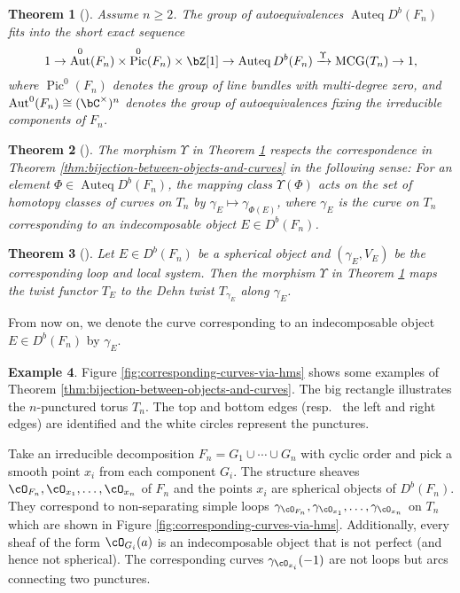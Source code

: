 \documentclass{amsart}
\numberwithin{equation}{section}
\theoremstyle{plain}
\newtheorem{theorem}{Theorem}[section]
\theoremstyle{definition}
\newtheorem{example}[theorem]{Example}
\DeclareMathOperator{\Auteq}{\mathrm{Auteq}}
\DeclareMathOperator{\Pic}{\mathrm{Pic}}
\DeclareMathOperator{\MCG}{\mathrm{MCG}}
\DeclareMathOperator{\Aut}{\mathrm{Aut}}
\begin{document}
\begin{theorem}[{\cite[Theorem D]{2020arXiv201108288O}}]\label{thm:autoequivalence-of-I_n-curve}
    Assume $n \geq 2$.
    The group of autoequivalences $\Auteq{D^b(F_n)}$ fits into the short exact sequence
    \begin{equation}
        1 \to \Aut^0(F_n) \times \Pic^0(F_n) \times \bZ[1] \to \Auteq{D^b(F_n)} \xrightarrow{\Upsilon} \MCG(T_n) \to 1,
    \end{equation}
    where $\Pic^0(F_n)$ denotes the group of line bundles with multi-degree zero, and $\Aut^0(F_n) \cong (\bC^\times)^n$ denotes the group of autoequivalences fixing the irreducible components of $F_n$.
\end{theorem}
\begin{theorem}[{\cite[Corollary 7.37]{2020arXiv201108288O}}]\label{thm:definition-of-upsilon}
    The morphism $\Upsilon$ in Theorem \ref{thm:autoequivalence-of-I_n-curve} respects the correspondence in Theorem \ref{thm:bijection-between-objects-and-curves} in the following sense:
    For an element $\Phi \in \Auteq{D^b(F_n)}$, the mapping class $\Upsilon(\Phi)$ acts on the set of homotopy classes of curves on $T_n$ by $\gamma_E \mapsto \gamma_{\Phi(E)}$, where $\gamma_E$ is the curve on $T_n$ corresponding to an indecomposable object $E \in D^b(F_n)$.
\end{theorem}
\begin{theorem}[{\cite[Theorem 5.9]{2020arXiv201108288O}}]\label{thm:spherical-twist-and-dehn-twist}
    Let $E \in D^b(F_n)$ be a spherical object and $(\gamma_E, V_E)$ be the corresponding loop and local system. Then the morphism $\Upsilon$ in Theorem \ref{thm:autoequivalence-of-I_n-curve} maps the twist functor $T_E$ to the Dehn twist $T_{\gamma_E}$ along $\gamma_E$.
\end{theorem}

From now on, we denote the curve corresponding to an indecomposable object $E \in D^b(F_n)$ by $\gamma_E$.


\begin{example}
    Figure \ref{fig:corresponding-curves-via-hms} shows some examples of Theorem \ref{thm:bijection-between-objects-and-curves}.
    The big rectangle illustrates the $n$-punctured torus $T_n$.
    The top and bottom edges (resp.~ the left and right edges) are identified and the white circles represent the punctures.

    Take an irreducible decomposition $F_n = G_1 \cup \cdots \cup G_n$ with cyclic order and pick a smooth point $x_i$ from each component $G_i$.
    The structure sheaves $\cO_{F_n}, \cO_{x_1}, \dots, \cO_{x_n}$ of $F_n$ and the points $x_i$ are spherical objects of $D^b(F_n)$.
    They correspond to non-separating simple loops $\gamma_{\cO_{F_n}}, \gamma_{\cO_{x_1}}, \dots, \gamma_{\cO_{x_n}}$ on $T_n$ which are shown in Figure \ref{fig:corresponding-curves-via-hms}.
    Additionally, every sheaf of the form $\cO_{G_i}(a)$ is an indecomposable object that is not perfect (and hence not spherical).
    The corresponding curves $\gamma_{\cO_{x_i}}(-1)$ are not loops but arcs connecting two punctures.
\end{example}
\end{document}
